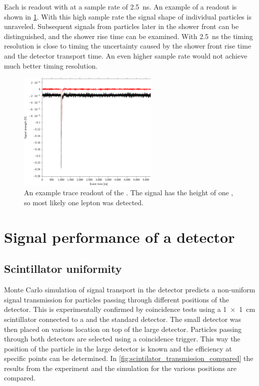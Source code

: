 Each \pmt is readout with \adcs at a sample rate of \SI{2.5}{\ns}. An example of a readout is shown in \cref{fig:trace}. With this high sample rate the signal shape of individual particles is unraveled. Subsequent signals from particles later in the shower front can be distinguished, and the shower rise time can be examined. With \SI{2.5}{\ns} the timing resolution is close to timing the uncertainty caused by the shower front rise time and the detector transport time. An even higher sample rate would not achieve much better timing resolution.

\begin{figure}
    \centering
    \includegraphics[width=0.6\textwidth]
                    {plots/station/trace}
    \caption{An example trace readout of the \pmt. The signal has the height of one \mip, so most likely one lepton was detected.}
    \label{fig:trace}
\end{figure}







\section{Signal performance of a detector}
\label{sec:detector-signal}

\subsection{Scintillator uniformity}

Monte Carlo simulation of signal transport in the detector predicts a non-uniform signal transmission for particles passing through different positions of the detector. This is experimentally confirmed by coincidence tests using a \SI[product-units = repeat]{1 x 1}{\centi\meter} scintillator connected to a \pmt and the standard detector. The small detector was then placed on various location on top of the large detector. Particles passing through both detectors are selected using a coincidence trigger. This way the position of the particle in the large detector is known and the efficiency at specific points can be determined. In \cref{fig:scintilator_transmission_compared} the results from the experiment and the simulation for the various positions are compared.

